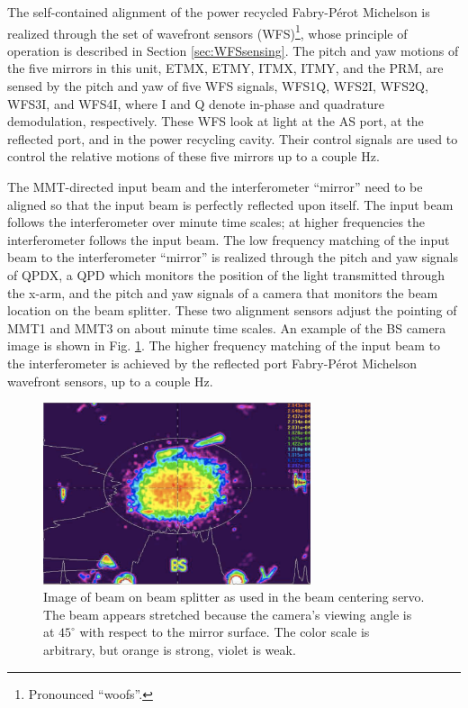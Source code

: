 The self-contained alignment of the power recycled Fabry-P\'{e}rot Michelson is realized through the set of wavefront sensors (WFS)\footnote{Pronounced ``woofs''.}, whose principle of operation is described in Section \ref{sec:WFSsensing}. The pitch and yaw motions of the five mirrors in this unit, ETMX, ETMY, ITMX, ITMY, and the PRM, are sensed by the pitch and yaw of five WFS signals, WFS1Q, WFS2I, WFS2Q, WFS3I, and WFS4I, where I and Q denote in-phase and quadrature demodulation, respectively. These WFS look at light at the AS port, at the reflected port, and in the power recycling cavity. Their control signals are used to control the relative motions of these five mirrors up to a couple Hz. 

The MMT-directed input beam and the interferometer ``mirror'' need to be aligned so that the input beam is perfectly reflected upon itself. The input beam follows the interferometer over minute time scales; at higher frequencies the interferometer follows the input beam. The low frequency matching of the input beam to the interferometer ``mirror'' is realized through the pitch and yaw signals of QPDX, a QPD which monitors the position of the light transmitted through the x-arm, and the pitch and yaw signals of a camera that monitors the beam location on the beam splitter. These two alignment sensors adjust the pointing of MMT1 and MMT3 on about minute time scales. An example of the BS camera image is shown in Fig. \ref{fig:BCS}. The higher frequency matching of the input beam to the interferometer is achieved by the reflected port Fabry-P\'{e}rot Michelson wavefront sensors, up to a couple Hz.

\begin{figure} 
\begin{centering} \includegraphics[width=0.7\textwidth]{figures/BCSspiricon.pdf} 
\caption[Beam centering servo image of beam splitter]{Image of beam on beam splitter as used in the beam centering servo. The beam appears stretched because the camera's viewing angle is at $45^{\circ}$ with respect to the mirror surface. The color scale is arbitrary, but orange is strong, violet is weak.}
\label{fig:BCS}
\end{centering}
\end{figure}

